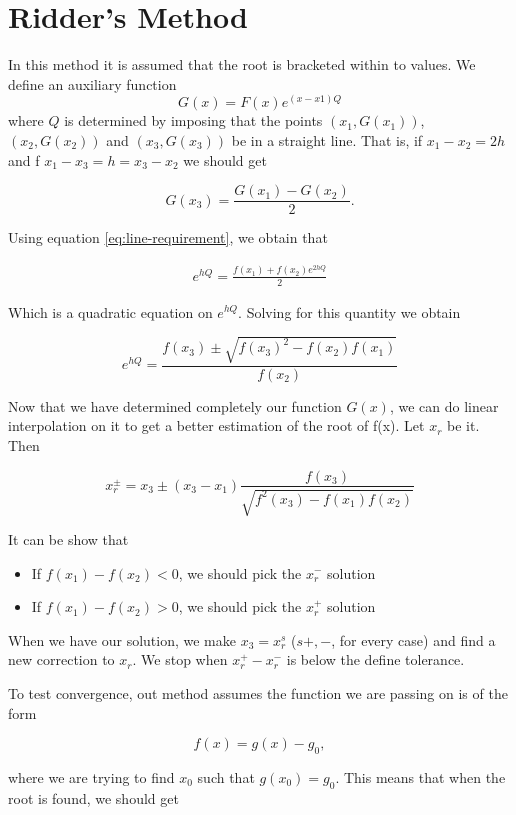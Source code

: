 \section{Ridder's Method}

In this method it is assumed that the root is bracketed within to values.  We define an auxiliary function 
$$G(x) = F(x)e^{(x-x1)Q}$$
where $Q$ is determined by imposing that the points $(x_1, G(x_1))$, $(x_2, G(x_2))$ and $(x_3, G(x_3))$ be in a straight line. That is, if $x_1-x_2 = 2h$ and f $x_1-x_3 = h = x_3-x_2$ we should get

\begin{equation}
G(x_3) = \frac{G(x_1)-G(x_2)}{2}.
\label{eq:line-requirement}
\end{equation}

Using equation \ref{eq:line-requirement}, we obtain that

\begin{eqnarray}
e^{hQ} = \frac{f(x_1)+f(x_2)e^{2hQ}}{2}
\end{eqnarray}

Which is a quadratic equation on $e^{hQ}$. Solving for this quantity we obtain

\begin{equation}
e^{hQ} = \frac{f(x_3)\pm\sqrt{f(x_3)^2-f(x_2)f(x_1)}}{f(x_2)}
\end{equation}

Now that we have determined completely our function $G(x)$, we can do linear interpolation on it to get a better estimation of the root of f(x). Let $x_r$  be it. Then

$$x_r^{\pm} = x_3 \pm (x_3-x_1)\frac{f(x_3)}{\sqrt{f^2(x_3)-f(x_1)f(x_2)}}$$

It can be show that 
\begin{itemize}
\item If $f(x_1)-f(x_2) < 0$, we should pick the $x_r^-$ solution
\item If $f(x_1)-f(x_2) > 0$, we should pick the $x_r^+$ solution
\end{itemize}

When we have our solution, we make $x_3 = x_r^{s}$ ($s+,-$, for every case) and find a new correction to $x_r$. We stop when $x_r^+-x_r^-$ is below the define tolerance.

To test convergence, out method assumes the function we are passing on is of the form

$$f(x) = g(x) -g_0,$$

where we are trying to find $x_0$ such that $g(x_0) = g_0$. This means that when the root is found, we should get 

